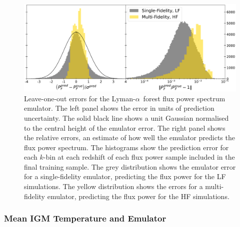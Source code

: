 \documentclass[a4paper,11pt]{article}
\newcommand{\Lya}{Lyman-$\alpha$}
\begin{document}
\begin{figure}
    \centering
    \includegraphics[width=\textwidth]{figures/fpsemu_errors.pdf}
    \caption{\label{fig:fps_error}
    Leave-one-out errors for the \Lya~forest flux power spectrum emulator.
    The left panel shows the error in units of prediction uncertainty. The solid black line shows a unit Gaussian normalised to the central height of the emulator error.
    The right panel shows the relative errors, an estimate of how well the emulator predicts the flux power spectrum.
    The histograms show the prediction error for each $k$-bin at each redshift of each flux power sample included in the final training sample.
    The grey distribution shows the emulator error for a single-fidelity emulator, predicting the flux power for the LF simulations.
    The yellow distribution shows the errors for a multi-fidelity emulator, predicting the flux power for the HF simulations.
    }
\end{figure}


\subsubsection{Mean IGM Temperature and Emulator}
\end{document}
